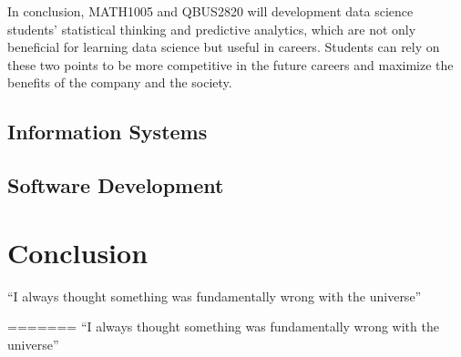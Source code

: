 \documentclass{article}
\begin{document}
In conclusion, MATH1005 and QBUS2820 will development data science students' statistical thinking and predictive analytics, which are not only beneficial for learning data science but useful in careers. Students can rely on these two points to be more competitive in the future careers and maximize the benefits of the company and the society.

\subsection{Information Systems}


\subsection{Software Development}

\section{Conclusion}
``I always thought something was fundamentally wrong with the universe'' \citep{adams1995hitchhiker}



=======
``I always thought something was fundamentally wrong with the universe\cite{Burridge_2018a}''
{}

% 








\end{document}
